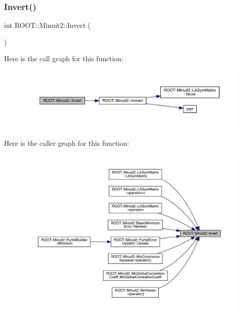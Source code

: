 \mbox{\label{namespaceROOT_1_1Minuit2_a3d7791001fe4298059c858771fba35db}} 
\subsubsection{\texorpdfstring{Invert()}{Invert()}}
{\footnotesize\ttfamily int R\+O\+O\+T\+::\+Minuit2\+::\+Invert (\begin{DoxyParamCaption}\item[{\mbox{\hyperlink{classROOT_1_1Minuit2_1_1LASymMatrix}{L\+A\+Sym\+Matrix}} \&}]{ }\end{DoxyParamCaption})}

Here is the call graph for this function\+:\nopagebreak
\begin{figure}[H]
\begin{center}
\leavevmode
\includegraphics[width=350pt]{d6/d3a/namespaceROOT_1_1Minuit2_a3d7791001fe4298059c858771fba35db_cgraph}
\end{center}
\end{figure}
Here is the caller graph for this function\+:\nopagebreak
\begin{figure}[H]
\begin{center}
\leavevmode
\includegraphics[width=350pt]{d6/d3a/namespaceROOT_1_1Minuit2_a3d7791001fe4298059c858771fba35db_icgraph}
\end{center}
\end{figure}
\mbox{\label{namespaceROOT_1_1Minuit2_a053d4f8b9de7ec9beead27f2ce08be44}} 
